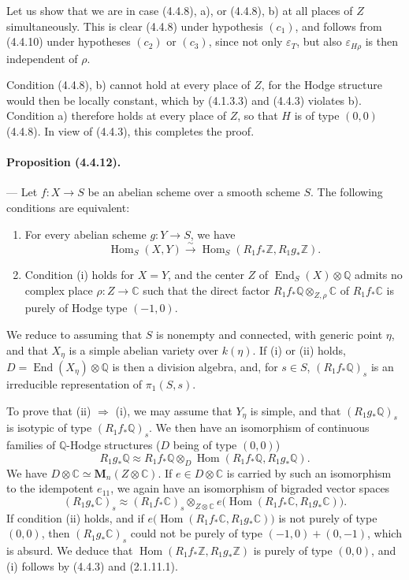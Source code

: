 \documentclass[10pt]{article}
\newcommand{\C}{\mathbb C}
\newcommand{\Q}{\mathbb Q}
\newcommand{\Z}{\mathbb Z}
\newcommand{\Hom}{\operatorname{Hom}}
\newcommand{\iso}{\xrightarrow{\sim}}
\providecommand{\End}{\operatorname{End}}
\begin{document}
Let us show that we are in case (4.4.8), a), or (4.4.8), b) at all places of $Z$ simultaneously. This is clear (4.4.8) under hypothesis $(c_1)$, and follows from (4.4.10) under hypotheses $(c_2)$ or $(c_3)$, since not only $\varepsilon_T$, but also $\varepsilon_{H\rho}$ is then independent of $\rho$.

Condition (4.4.8), b) cannot hold at every place of $Z$, for the Hodge structure would then be locally constant, which by (4.1.3.3) and (4.4.3) violates b). Condition a) therefore holds at every place of $Z$, so that $H$ is of type $(0,0)$ (4.4.8). In view of (4.4.3), this completes the proof.

\paragraph{Proposition (4.4.12).} --- Let $f:X\to S$ be an abelian scheme over a smooth scheme $S$. The following conditions are equivalent:
\begin{enumerate}[label=(\roman*)]
\item For every abelian scheme $g:Y\to S$, we have
\[
\Hom_S(X,Y)\iso \Hom_S(R_1f_*\Z,R_1g_*\Z).
\]
\item Condition (i) holds for $X=Y$, and the center $Z$ of $\End_S(X)\otimes\Q$ admits no complex place $\rho:Z\to\C$ such that the direct factor $R_1f_*\Q\otimes_{Z,\rho}\C$ of $R_1f_*\C$ is purely of Hodge type $(-1,0)$.
\end{enumerate}




We reduce to assuming that $S$ is nonempty and connected, with generic point $\eta$, and that $X_\eta$ is a simple abelian variety over $k(\eta)$. If (i) or (ii) holds, $D=\End(X_\eta)\otimes\Q$ is then a division algebra, and, for $s\in S$, $(R_1f_*\Q)_s$ is an irreducible representation of $\pi_1(S,s)$.

To prove that (ii) $\Rightarrow$ (i), we may assume that $Y_\eta$ is simple, and that $(R_1g_*\Q)_s$ is isotypic of type $(R_1f_*\Q)_s$. We then have an isomorphism of continuous families of $\Q$-Hodge structures ($D$ being of type $(0,0)$)
\[
R_1g_*\Q\approx R_1f_*\Q\otimes_D
\Hom(R_1f_*\Q,R_1g_*\Q).
\]
We have $D\otimes\C\simeq \mathbf{M}_n(Z\otimes\C)$. If $e\in D\otimes\C$ is carried by such an isomorphism to the idempotent $e_{11}$, we again have an isomorphism of bigraded vector spaces
\[
(R_1g_*\C)_s\approx (R_1f_*\C)_s\otimes_{Z\otimes\C}
e\bigl(\Hom(R_1f_*\C,R_1g_*\C)\bigr).
\]
If condition (ii) holds, and if $e\bigl(\Hom(R_1f_*\C,R_1g_*\C)\bigr)$ is not purely of type $(0,0)$, then $(R_1g_*\C)_s$ could not be purely of type $(-1,0)+(0,-1)$, which is absurd. We deduce that $\Hom(R_1f_*\Z,R_1g_*\Z)$ is purely of type $(0,0)$, and (i) follows by (4.4.3) and (2.1.11.1).
\end{document}
